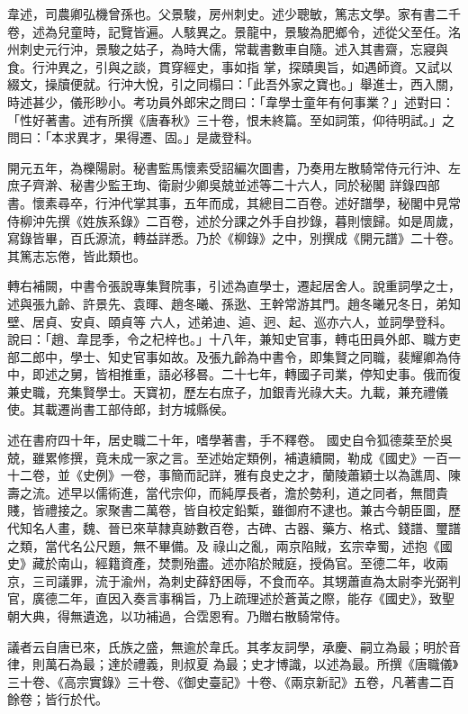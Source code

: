 \begin{pinyinscope}
 韋述，司農卿弘機曾孫也。父景駿，房州刺史。述少聰敏，篤志文學。家有書二千卷，述為兒童時，記覽皆遍。人駭異之。景龍中，景駿為肥鄉令，述從父至任。洺州刺史元行沖，景駿之姑子，為時大儒，常載書數車自隨。述入其書齋，忘寢與食。行沖異之，引與之談，貫穿經史，事如指
 掌，探賾奧旨，如遇師資。又試以綴文，操牘便就。行沖大悅，引之同榻曰：「此吾外家之寶也。」舉進士，西入關，時述甚少，儀形眇小。考功員外郎宋之問曰：「韋學士童年有何事業？」述對曰：「性好著書。述有所撰《唐春秋》三十卷，恨未終篇。至如詞策，仰待明試。」之問曰：「本求異才，果得遷、固。」是歲登科。



 開元五年，為櫟陽尉。秘書監馬懷素受詔編次圖書，乃奏用左散騎常侍元行沖、左庶子齊澣、秘書少監王珣、衛尉少卿吳兢並述等二十六人，同於秘閣
 詳錄四部書。懷素尋卒，行沖代掌其事，五年而成，其總目二百卷。述好譜學，秘閣中見常侍柳沖先撰《姓族系錄》二百卷，述於分課之外手自抄錄，暮則懷歸。如是周歲，寫錄皆畢，百氏源流，轉益詳悉。乃於《柳錄》之中，別撰成《開元譜》二十卷。其篤志忘倦，皆此類也。



 轉右補闕，中書令張說專集賢院事，引述為直學士，遷起居舍人。說重詞學之士，述與張九齡、許景先、袁暉、趙冬曦、孫逖、王幹常游其門。趙冬曦兄冬日，弟知壁、居貞、安貞、頤貞等
 六人，述弟迪、逌、迥、起、巡亦六人，並詞學登科。說曰：「趙、韋昆季，令之杞梓也。」十八年，兼知史官事，轉屯田員外郎、職方吏部二郎中，學士、知史官事如故。及張九齡為中書令，即集賢之同職，裴耀卿為侍中，即述之舅，皆相推重，語必移晷。二十七年，轉國子司業，停知史事。俄而復兼史職，充集賢學士。天寶初，歷左右庶子，加銀青光祿大夫。九載，兼充禮儀使。其載遷尚書工部侍郎，封方城縣侯。



 述在書府四十年，居史職二十年，嗜學著書，手不釋卷。
 國史自令狐德棻至於吳兢，雖累修撰，竟未成一家之言。至述始定類例，補遺續闕，勒成《國史》一百一十二卷，並《史例》一卷，事簡而記詳，雅有良史之才，蘭陵蕭穎士以為譙周、陳壽之流。述早以儒術進，當代宗仰，而純厚長者，澹於勢利，道之同者，無間貴賤，皆禮接之。家聚書二萬卷，皆自校定鉛槧，雖御府不逮也。兼古今朝臣圖，歷代知名人畫，魏、晉已來草隸真跡數百卷，古碑、古器、藥方、格式、錢譜、璽譜之類，當代名公尺題，無不畢備。及
 祿山之亂，兩京陷賊，玄宗幸蜀，述抱《國史》藏於南山，經籍資產，焚剽殆盡。述亦陷於賊庭，授偽官。至德二年，收兩京，三司議罪，流于渝州，為刺史薛舒困辱，不食而卒。其甥蕭直為太尉李光弼判官，廣德二年，直因入奏言事稱旨，乃上疏理述於蒼黃之際，能存《國史》，致聖朝大典，得無遺逸，以功補過，合霑恩宥。乃贈右散騎常侍。



 議者云自唐已來，氏族之盛，無逾於韋氏。其孝友詞學，承慶、嗣立為最；明於音律，則萬石為最；達於禮義，則叔夏
 為最；史才博識，以述為最。所撰《唐職儀》三十卷、《高宗實錄》三十卷、《御史臺記》十卷、《兩京新記》五卷，凡著書二百餘卷；皆行於代。




\end{pinyinscope}
